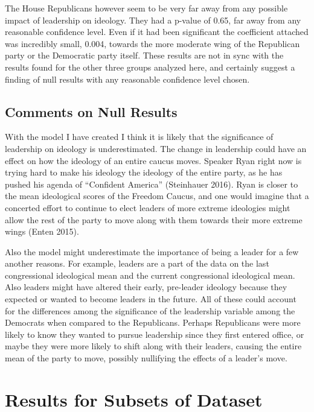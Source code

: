 \documentclass[12pt,twoside]{reedthesis}
\begin{document}
  The House Republicans however seem to be very far away from any possible
  impact of leadership on ideology. They had a p-value of 0.65, far away
  from any reasonable confidence level. Even if it had been significant
  the coefficient attached was incredibly small, 0.004, towards the more
  moderate wing of the Republican party or the Democratic party itself.
  These results are not in sync with the results found for the other three
  groups analyzed here, and certainly suggest a finding of null results
  with any reasonable confidence level chosen.
  
  \subsection{Comments on Null Results}\label{comments-on-null-results}
  
  With the model I have created I think it is likely that the significance
  of leadership on ideology is underestimated. The change in leadership
  could have an effect on how the ideology of an entire caucus moves.
  Speaker Ryan right now is trying hard to make his ideology the ideology
  of the entire party, as he has pushed his agenda of ``Confident
  America'' (Steinhauer 2016). Ryan is closer to the mean ideological
  scores of the Freedom Caucus, and one would imagine that a concerted
  effort to continue to elect leaders of more extreme ideologies might
  allow the rest of the party to move along with them towards their more
  extreme wings (Enten 2015).
  
  Also the model might underestimate the importance of being a leader for
  a few another reasons. For example, leaders are a part of the data on
  the last congressional ideological mean and the current congressional
  ideological mean. Also leaders might have altered their early,
  pre-leader ideology because they expected or wanted to become leaders in
  the future. All of these could account for the differences among the
  significance of the leadership variable among the Democrats when
  compared to the Republicans. Perhaps Republicans were more likely to
  know they wanted to pursue leadership since they first entered office,
  or maybe they were more likely to shift along with their leaders,
  causing the entire mean of the party to move, possibly nullifying the
  effects of a leader's move.
  
  \section{Results for Subsets of
  Dataset}\label{results-for-subsets-of-dataset}
  
\end{document}
